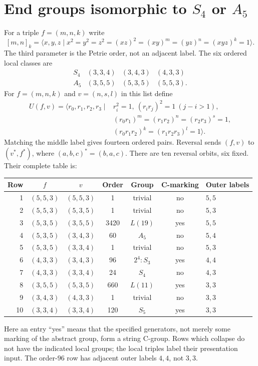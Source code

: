 \documentclass[11pt,a4paper]{article}
\begin{document}
\section{End groups isomorphic to \texorpdfstring{$S_4$ or $A_5$}{S4 or A5}}
For a triple $f=(m,n,k)$ write
\begin{equation}\label{eq:local}
 [m,n]_k=\langle x,y,z\mid x^2=y^2=z^2=(xz)^2=
 (xy)^m=(yz)^n=(xyz)^k=1\rangle.
\end{equation}
The third parameter is the Petrie order, not an adjacent label.
The six ordered local classes are
\begin{equation}\label{eq:localtypes}
\begin{array}{c|ccc}
 S_4&(3,3,4)&(3,4,3)&(4,3,3)\\
 A_5&(3,5,5)&(5,3,5)&(5,5,3).
\end{array}
\end{equation}
For $f=(m,n,k)$ and $v=(n,s,l)$ in this list define
\begin{equation}\label{eq:universal}
\begin{split}
 U(f,v)=\langle r_0,r_1,r_2,r_3\mid{}
 &r_i^2=1,\ (r_ir_j)^2=1\ (j-i>1),\\
 &(r_0r_1)^m=(r_1r_2)^n=(r_2r_3)^s=1,\\
 &(r_0r_1r_2)^k=(r_1r_2r_3)^l=1\rangle.
\end{split}
\end{equation}
Matching the middle label gives fourteen ordered pairs. Reversal sends
$(f,v)$ to $(v^*,f^*)$, where $(a,b,c)^*=(b,a,c)$.
There are ten reversal orbits, six fixed. Their complete table is:
\begin{center}\small
\begin{tabular}{rcccccl}
\toprule
Row&$f$&$v$&Order&Group&C-marking&Outer labels\\
\midrule
1&$(5,5,3)$&$(5,5,3)$&1&trivial&no&$5,5$\\
2&$(5,5,3)$&$(5,3,5)$&1&trivial&no&$5,3$\\
3&$(5,3,5)$&$(3,5,5)$&3420&$L(19)$&yes&$5,5$\\
4&$(5,3,5)$&$(3,4,3)$&60&$A_5$&no&$5,4$\\
5&$(5,3,5)$&$(3,3,4)$&1&trivial&no&$5,3$\\
6&$(4,3,3)$&$(3,4,3)$&96&$2^4:S_3$&yes&$4,4$\\
7&$(4,3,3)$&$(3,3,4)$&24&$S_4$&no&$4,3$\\
8&$(3,5,5)$&$(5,3,5)$&660&$L(11)$&yes&$3,3$\\
9&$(3,4,3)$&$(4,3,3)$&1&trivial&no&$3,3$\\
10&$(3,3,4)$&$(3,3,4)$&120&$S_5$&yes&$3,3$\\
\bottomrule
\end{tabular}
\end{center}
Here an entry ``yes'' means that the specified generators, not merely some
marking of the abstract group, form a string C-group. Rows which collapse
do not have the indicated local groups; the local triples label their
presentation input. The order-$96$ row has adjacent outer labels $4,4$,
not $3,3$.
\end{document}
